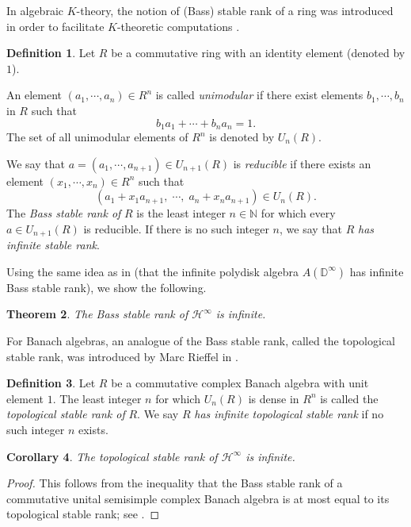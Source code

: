 \documentclass[11pt,reqno]{amsart}
\numberwithin{equation}{section}
\newtheorem{theorem}{Theorem}[section]
\newtheorem{corollary}[theorem]{Corollary}
\theoremstyle{definition}
\theoremstyle{definition}
\newtheorem{definition}[theorem]{Definition}
\theoremstyle{definition}
\begin{document}
In algebraic $K$-theory, the notion of (Bass) stable rank of a ring
was introduced in order to facilitate $K$-theoretic computations 
\cite{Bas}.

\begin{definition}
Let $R$ be a commutative ring with an identity element (denoted by $1$). 

\noindent An element $(a_1,\cdots, a_n)\in R^n$ is called {\em unimodular} if
there exist elements $b_1,\cdots, b_n$ in $R$ such that
  $$
 b_1 a_1+\cdots +b_n a_n=1. 
 $$
The set of all unimodular elements of $R^n$ is denoted by $U_n (R)$. 

\noindent We say that $
 a=(a_1,\cdots, a_{n+1})\in U_{n+1}(R)
$ 
is {\em reducible} if there exists an element $(x_1,\cdots, x_n)\in R^n $ such
that
$$
(a_1+x_1 a_{n+1},\;\cdots, \; a_n+ x_n a_{n+1})\in U_n(R).
$$
The {\em Bass stable rank of } $R$ is the least integer $n\in {\mathbb{N}}$ for
which every $a\in U_{n+1}(R)$ is reducible. If there is no such
integer $n$, we say that $R$ {\em has infinite stable rank}.
\end{definition}

\noindent Using the same idea as in \cite[Proposition~1]{Mor} (that
the infinite polydisk algebra $A({\mathbb{D}}^\infty)$ has infinite Bass stable
rank), we show the following.

\begin{theorem}
\label{Bass_stable_rank_of_A_DS}
 The Bass stable rank of ${{{\mathscr{H}}^{\infty}}}$ is infinite.
\end{theorem}

For Banach algebras, an analogue of the Bass stable rank, called 
the topological stable rank, was introduced by Marc Rieffel in \cite{Rie}.

\begin{definition}
  Let $R$ be a commutative complex Banach algebra with unit element
  $1$. The least integer $n$ for which $U_n(R)$ is dense in $R^n$ is
  called the {\em topological stable rank of } $R$. We say $R$ {\em
    has infinite topological stable rank} if no such integer $n$
  exists.
 \end{definition}
 
\begin{corollary}
  The topological stable rank of ${{{\mathscr{H}}^{\infty}}}$ is infinite. 
\end{corollary}
\begin{proof} This follows from the inequality that the Bass stable
  rank of a commutative unital semisimple complex Banach algebra is at
  most equal to its topological stable rank; see \cite[Corollary
  2.4]{Rie}.
\end{proof}
\end{document}
